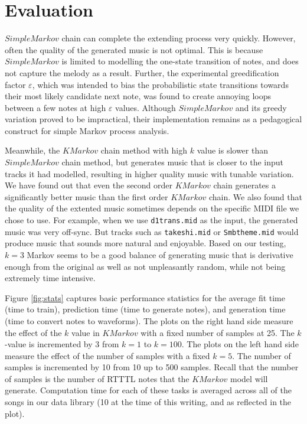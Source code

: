 \documentclass{article}
\begin{document}
\section{Evaluation}
$SimpleMarkov$ chain can complete the extending process very quickly. However, often the quality of the generated music is not optimal. This is because $SimpleMarkov$ is 
limited to modelling the one-state transition of notes, and does not capture the melody as a result. Further, the experimental greedification factor $\varepsilon$, which was 
intended to bias the probabilistic state transitions towards their most likely candidate next note, was found to create annoying loops between a few notes at high $\varepsilon$ 
values. Although $SimpleMarkov$ and its greedy variation proved to be impractical, their implementation remains as a pedagogical construct for simple Markov process analysis. 

Meanwhile, the $KMarkov$ chain method with high $k$ value is slower than $SimpleMarkov$ chain method, but generates music that is closer to the input tracks it had modelled, 
resulting in higher quality music with tunable variation. We have found out that even the second order $KMarkov$ chain generates a significantly better music than the first 
order $KMarkov$ chain. We also found that the quality of the extented music sometimes depends on the specific MIDI file we chose to use.
For example, when we use \texttt{d1trans.mid} as the input, the generated music was very off-sync. But tracks such as \texttt{takeshi.mid} or \texttt{Smbtheme.mid} would 
produce music that sounds more natural and enjoyable. Based on our testing, $k=3$ Markov seems to be a good balance of generating music that is derivative enough from the 
original as well as not unpleasantly random, while not being extremely time intensive.

Figure \ref{fig:stats} captures basic performance statistics for the average fit time (time to train), prediction time (time to generate notes), and 
generation time (time to convert notes to waveforms). The plots on the right hand side measure the effect of the $k$ value in $KMarkov$ with a fixed number of samples at 25. 
The $k$-value is incremented by 3 from $k=1$ to $k=100$. The plots on the left hand side measure the effect of the number of samples with a fixed $k=5$. The number of samples 
is incremented by 10 from 10 up to 500 samples. Recall that the number of samples is the number of RTTTL notes that the $KMarkov$ model will generate. Computation time for 
each of these tasks is averaged across all of the songs in our data library (10 at the time of this writing, and as reflected in the plot).
\end{document}
